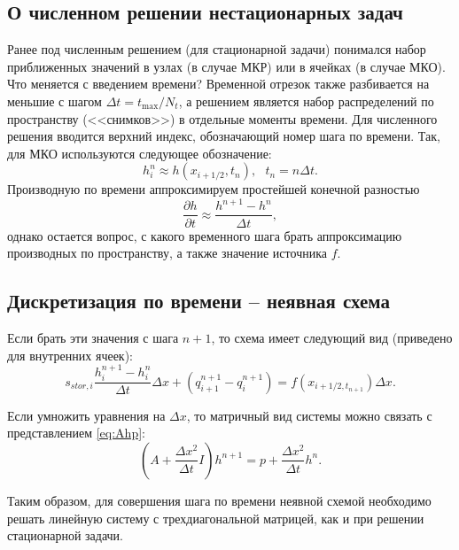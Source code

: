 \documentclass[a4paper, 11pt]{article}
\begin{document}
\subsection{О численном решении нестационарных задач}
Ранее под численным решением (для стационарной задачи) понимался набор приближенных значений в узлах (в случае МКР) или в ячейках (в случае МКО). Что меняется с 
введением времени? Временной отрезок также разбивается на меньшие с шагом $\Delta t = t_{\max}/N_t$, 
а решением является набор распределений по пространству (<<снимков>>) в отдельные моменты времени. Для численного решения вводится верхний индекс, обозначающий номер
шага по времени. Так, для МКО используются следующее обозначение:
\begin{equation}
	h_i^n \approx h(x_{i+1/2}, t_n),~~~t_n = n\Delta t.
\end{equation}
Производную по времени аппроксимируем простейшей конечной разностью
\begin{equation}
	\frac{\partial h}{\partial t} \approx \frac{h^{n+1} - h^n}{\Delta t},
\end{equation}
однако остается вопрос, с какого временного шага брать аппроксимацию производных по пространству, а также
значение источника $f$.


\subsection{Дискретизация по времени -- неявная схема}
Если брать эти значения с шага $n+1$, то схема имеет следующий вид (приведено для внутренних ячеек):
\begin{equation}
	s_{stor,i}\frac{h_i^{n+1} - h_i^n}{\Delta t}\Delta x + (q_{i+1}^{n+1} - q_i^{n+1}) = f(x_{i+1/2, t_{n+1}})\Delta x. 
\end{equation}

Если умножить уравнения на $\Delta x$, то матричный вид системы можно связать с представлением \eqref{eq:Ahp}:
\begin{equation}
	\left(A + \frac{\Delta x^2}{\Delta t}I\right)h^{n+1} = p + \frac{\Delta x^2}{\Delta t}h^n.
\end{equation}

Таким образом, для совершения шага по времени неявной схемой необходимо решать линейную систему с трехдиагональной матрицей, как и при решении стационарной задачи.

\end{document}
